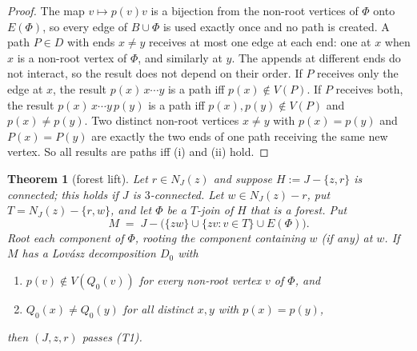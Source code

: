 \documentclass[11pt]{amsart}
\newtheorem{theorem}{Theorem}[section]
\theoremstyle{definition}
\begin{document}
\begin{proof}
The map $v\mapsto p(v)v$ is a bijection from the non-root vertices of $\Phi$ onto $E(\Phi)$, so every
edge of $B\cup\Phi$ is used exactly once and no path is created. A path $P\in D$ with ends $x\ne y$
receives at most one edge at each end: one at $x$ when $x$ is a non-root vertex of $\Phi$, and
similarly at $y$. The appends at different ends do not interact, so the result does not depend on
their order. If $P$ receives only the edge at $x$, the result $p(x)\,x\cdots y$ is a path iff
$p(x)\notin V(P)$. If $P$ receives both, the result $p(x)\,x\cdots y\,p(y)$ is a path iff
$p(x),p(y)\notin V(P)$ and $p(x)\ne p(y)$. Two distinct non-root vertices $x\ne y$ with $p(x)=p(y)$
and $P(x)=P(y)$ are exactly the two ends of one path receiving the same new vertex. So all results are
paths iff (i) and (ii) hold.
\end{proof}

\begin{theorem}[forest lift]\label{thm:forest}
Let $r\in N_J(z)$ and suppose $H:=J-\{z,r\}$ is connected; this holds if $J$ is $3$-connected. Let
$w\in N_J(z)-r$, put $T=N_J(z)-\{r,w\}$, and let $\Phi$ be a $T$-join of $H$ that is a forest. Put
\[
M \;=\; J-\bigl(\{zw\}\cup\{zv:v\in T\}\cup E(\Phi)\bigr).
\]
Root each component of $\Phi$, rooting the component containing $w$ (if any) at $w$. If $M$ has a
Lov\'asz decomposition $D_0$ with
\begin{enumerate}[label=(\roman*)]
\item $p(v)\notin V(Q_0(v))$ for every non-root vertex $v$ of $\Phi$, and
\item $Q_0(x)\ne Q_0(y)$ for all distinct $x,y$ with $p(x)=p(y)$,
\end{enumerate}
then $(J,z,r)$ passes (T1).
\end{theorem}
\end{document}
